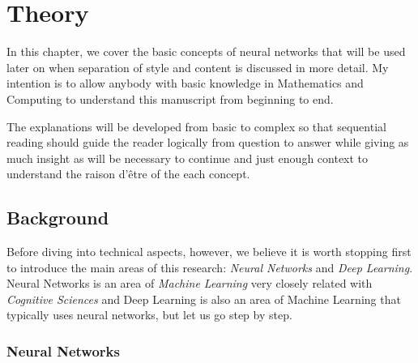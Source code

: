 
\chapter{Theory}
\label{chap:theory}




In this chapter, we cover the basic concepts of neural networks that will be used later on when separation of style and content is discussed in more detail.
My intention is to allow anybody with basic knowledge in Mathematics and Computing to understand this manuscript from beginning to end.

The explanations will be developed from basic to complex so that sequential reading should guide the reader logically from question to answer while giving as much insight as will be necessary to continue and just enough context to understand the raison d'être of the each concept.



\section{Background}
\label{sec:theory:background}

Before diving into technical aspects, however, we believe it is worth stopping first to introduce the main areas of this research: \emph{Neural Networks} and \emph{Deep Learning}.
Neural Networks is an area of \emph{Machine Learning} very closely related with \emph{Cognitive Sciences} and Deep Learning is also an area of Machine Learning that typically uses neural networks, but let us go step by step.


\subsection{Neural Networks}
\label{sub:theory:background:neural-networks}

